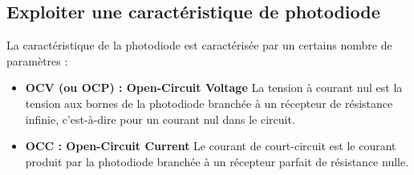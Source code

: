 \documentclass[twoside,a4paper,11pt,addpoints,answers]{exam}%
\newcounter{foo} %
\begin{document}

\subsection{Exploiter une caractéristique de photodiode}

La caractéristique de la photodiode est caractérisée par un certains nombre de paramètres : 

\begin{itemize}
\item \textbf{OCV (ou OCP) : Open-Circuit Voltage} La tension à courant nul est la tension aux bornes de la photodiode branchée à un récepteur de résistance infinie, c'est-à-dire pour un courant nul dans le circuit.
\item \textbf{OCC : Open-Circuit Current} Le courant de court-circuit est le courant produit par la photodiode branchée à un récepteur parfait de résistance nulle.
\end{itemize}
\end{document}
